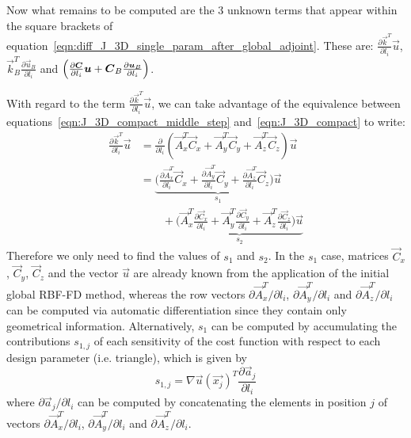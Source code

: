 
Now what remains to be computed are the $3$ unknown terms that appear within the square brackets of equation~\eqref{eqn:diff_J_3D_single_param_after_global_adjoint}. These are: $\frac{\partial \vec{k}^T}{\partial l_i}\vec{u}$, $\vec{k}_B^T \frac{\partial \vec{u}_B}{\partial l_i}$ and $\Bigl( \frac{\partial \vec{C}}{\partial l_i}\vec{u} + \vec{C}_B\frac{\partial \vec{u}_B}{\partial l_i} \Bigr)$.

\medskip
With regard to the term $\frac{\partial \vec{k}^T}{\partial l_i}\vec{u}$, we can take advantage of the equivalence between equations~\eqref{eqn:J_3D_compact_middle_step} and~\eqref{eqn:J_3D_compact} to write:
\begin{equation}
	\begin{split}
		\frac{\partial \vec{k}^T}{\partial l_i}\vec{u} & = \frac{\partial}{\partial l_i} (\vec{A}_x^T\vec{C}_x + \vec{A}_y^T\vec{C}_y + \vec{A}_z^T\vec{C}_z) \vec{u}  \\
		& = \underbrace{\biggl( \frac{\partial \vec{A}_x^T}{\partial l_i}\vec{C}_x + \frac{\partial \vec{A}_y^T}{\partial l_i}\vec{C}_y + \frac{\partial \vec{A}_z^T}{\partial l_i}\vec{C}_z \biggr) \vec{u}}_{s_1}  \\
		&\qquad + \underbrace{\biggl( \vec{A}_x^T\frac{\partial \vec{C}_x}{\partial l_i} + \vec{A}_y^T\frac{\partial \vec{C}_y}{\partial l_i} + \vec{A}_z^T\frac{\partial \vec{C}_z}{\partial l_i}\biggr) \vec{u}}_{s_2}
	\end{split}
\end{equation}
Therefore we only need to find the values of $s_1$ and $s_2$.
In the $s_1$ case, matrices $\vec{C}_x$, $\vec{C}_y$, $\vec{C}_z$ and the vector $\vec{u}$ are already known from the application of the initial global RBF-FD method, whereas the row vectors $\partial \vec{A}_x^T / \partial l_i$, $\partial \vec{A}_y^T / \partial l_i$ and $\partial \vec{A}_z^T / \partial l_i$ can be computed via automatic differentiation since they contain only geometrical information.
Alternatively, $s_1$ can be computed by accumulating the contributions $s_{1,j}$ of each sensitivity of the cost function with respect to each design parameter (i.e. triangle), which is given by
\begin{equation}
	s_{1,j} = \nabla\vec{u}(\vec{x_j})^T \frac{\partial \vec{a}_j}{\partial l_i}	
\end{equation}
where $\partial \vec{a}_j / \partial l_i$ can be computed by concatenating the elements in position $j$ of vectors $\partial \vec{A}_x^T / \partial l_i$, $\partial \vec{A}_y^T / \partial l_i$ and $\partial \vec{A}_z^T / \partial l_i$.

